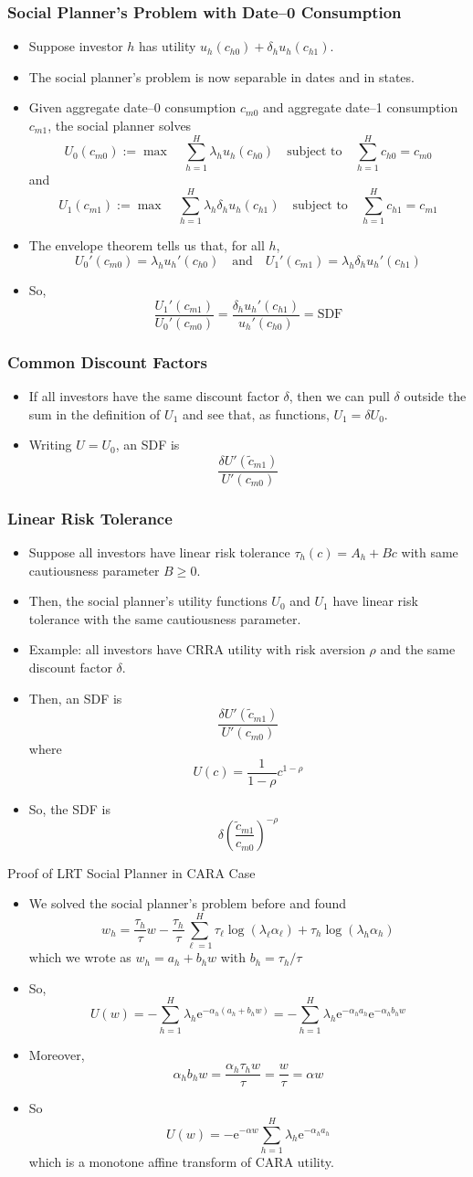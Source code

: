 \documentclass[10pt]{beamer}
\newcommand{\bi}{\begin{itemize}}
\newcommand{\ei}{\end{itemize}}
\newcommand{\im}{\item}
\newcommand{\E}{\mathrm{e}}
\newcommand{\bfr}{\begin{frame}}
\begin{document}
\bfr\frametitle{Social Planner's Problem with Date--0 Consumption}
\bi 
\im Suppose investor $h$ has utility $u_h(c_{h0}) + \delta_h u_h(c_{h1})$.  
\im The social planner's problem is now separable in dates and in states. 
\ei 
\end{frame}

\begin{frame}[plain] 
    \bi 
\im Given aggregate date--0 consumption $c_{m0}$ and aggregate date--1 consumption $c_{m1}$, the social planner solves 
$$U_0(c_{m0}) := \max \quad \sum_{h=1}^H \lambda_hu_h(c_{h0}) \quad \text{subject to} \quad \sum_{h=1}^H c_{h0} = c_{m0}$$
and
$$U_1(c_{m1}) := \max \quad \sum_{h=1}^H \lambda_h\delta_h u_h(c_{h1}) \quad \text{subject to} \quad \sum_{h=1}^H c_{h1} = c_{m1}$$

\im The envelope theorem tells us that, for all $h$,
$$U_0'(c_{m0}) = \lambda_h u_h'(c_{h0}) \quad \text{and} \quad U_1'(c_{m1}) = \lambda_h \delta_h u_h'(c_{h1})$$
\im So,
$$\frac{U_1'(c_{m1})}{U_0'(c_{m0})} = \frac{\delta_h u_h'(c_{h1})}{u_h'(c_{h0})} = \text{SDF}$$
\ei
\end{frame}

\bfr\frametitle{Common Discount Factors}
\bi 
\im 
If all investors have the same discount factor $\delta$, then we can pull $\delta$ outside the sum in the definition of $U_1$ and see that, as functions, $U_1 = \delta U_0$.  

\im Writing $U=U_0$, an SDF is
$$\frac{\delta U'(\tilde{c}_{m1})}{U'(c_{m0})}$$
\ei
\end{frame}


\bfr\frametitle{Linear Risk Tolerance}
\bi 
\im Suppose all investors have linear risk tolerance $\tau_h(c) = A_h + B c$ with same cautiousness parameter $B\ge 0$.  
\im Then, the social planner's utility functions $U_0$ and $U_1$ have linear risk tolerance with the same cautiousness parameter.
\im 
Example: all investors have CRRA utility with risk aversion $\rho$ and the same discount factor $\delta$.  
\im Then, an SDF is
$$\frac{\delta U'(\tilde{c}_{m1})}{U'(c_{m0})}$$
where
$$U(c) = \frac{1}{1-\rho}c^{1-\rho}$$
\im So, the SDF is
$$\delta \left(\frac{\tilde{c}_{m1}}{c_{m0}}\right)^{-\rho}$$
\ei
\end{frame}

\begin{frame}{Proof of LRT Social Planner in CARA Case}
    \bi 
    \im 
We solved the social planner's problem before and found
$$ w_h =\frac{\tau _h}{\tau }w -\frac{\tau _h}{\tau }\sum_{\ell =1}^H \tau _\ell \log (\lambda_\ell \alpha_\ell ) + \tau _h\log(\lambda_h\alpha_h)$$
which we wrote as $w_h = a_h + b_h w$ with $b_h = \tau_h/\tau$
\im So,
$$U(w) = -\sum_{h=1}^H \lambda_h \E^{-\alpha_h (a_h + b_h w)} = -\sum_{h=1}^H \lambda_h \E^{-\alpha_ha_h}\E^{-\alpha_hb_hw} $$
 \im Moreover,
$$\alpha_h b_hw = \frac{\alpha_h \tau_hw}{\tau} = \frac{w}{\tau} = \alpha w$$
\im So
$$U(w) = -\E^{-\alpha w}\sum_{h=1}^H \lambda_h \E^{-\alpha_ha_h}$$
which is a monotone affine transform of CARA utility.
\ei 
\end{frame}
\end{document}
